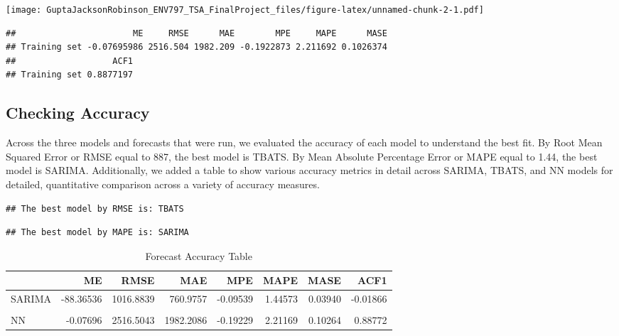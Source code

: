\documentclass[
]{article}
\begin{document}
\texttt{[image: GuptaJacksonRobinson\_ENV797\_TSA\_FinalProject\_files/figure-latex/unnamed-chunk-2-1.pdf]}

\begin{verbatim}
##                       ME     RMSE      MAE        MPE     MAPE      MASE
## Training set -0.07695986 2516.504 1982.209 -0.1922873 2.211692 0.1026374
##                   ACF1
## Training set 0.8877197
\end{verbatim}

\hypertarget{checking-accuracy}{%
\subsection{Checking Accuracy}\label{checking-accuracy}}

Across the three models and forecasts that were run, we evaluated the
accuracy of each model to understand the best fit. By Root Mean Squared
Error or RMSE equal to 887, the best model is TBATS. By Mean Absolute
Percentage Error or MAPE equal to 1.44, the best model is SARIMA.
Additionally, we added a table to show various accuracy metrics in
detail across SARIMA, TBATS, and NN models for detailed, quantitative
comparison across a variety of accuracy measures.

\begin{verbatim}
## The best model by RMSE is: TBATS
\end{verbatim}

\begin{verbatim}
## The best model by MAPE is: SARIMA
\end{verbatim}

\begin{table}

\caption{\label{tab:accuracy}Forecast Accuracy Table}
\centering
\begin{tabular}[t]{l|r|r|r|r|r|r|r}
\hline
  & ME & RMSE & MAE & MPE & MAPE & MASE & ACF1\\
\hline
SARIMA & -88.36536 & 1016.8839 & 760.9757 & -0.09539 & 1.44573 & 0.03940 & -0.01866\\
\hline
\cellcolor{gray!6}{TBATS} & \cellcolor{gray!6}{13.75430} & \cellcolor{gray!6}{887.3142} & \cellcolor{gray!6}{685.3520} & \cellcolor{gray!6}{-0.63538} & \cellcolor{gray!6}{2.30393} & \cellcolor{gray!6}{0.03549} & \cellcolor{gray!6}{-0.00187}\\
\hline
NN & -0.07696 & 2516.5043 & 1982.2086 & -0.19229 & 2.21169 & 0.10264 & 0.88772\\
\hline
\end{tabular}
\end{table}
\end{document}
